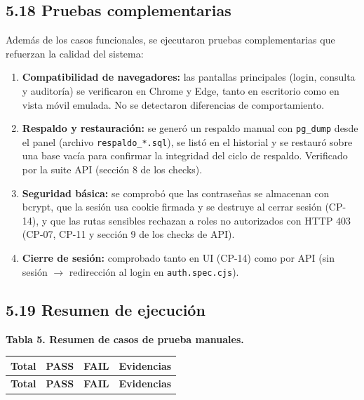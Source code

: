 \documentclass[11pt,a4paper]{article}
\begin{document}
\subsection*{5.18 Pruebas complementarias}


Además de los casos funcionales, se ejecutaron pruebas complementarias que refuerzan la calidad del sistema:


\begin{enumerate}[leftmargin=*]
\item \textbf{Compatibilidad de navegadores:} las pantallas principales (login, consulta y auditoría) se verificaron en Chrome y Edge, tanto en escritorio como en vista móvil emulada. No se detectaron diferencias de comportamiento.
\item \textbf{Respaldo y restauración:} se generó un respaldo manual con \texttt{pg\_dump} desde el panel (archivo \texttt{respaldo\_*.sql}), se listó en el historial y se restauró sobre una base vacía para confirmar la integridad del ciclo de respaldo. Verificado por la suite API (sección 8 de los checks).
\item \textbf{Seguridad básica:} se comprobó que las contraseñas se almacenan con bcrypt, que la sesión usa cookie firmada y se destruye al cerrar sesión (CP-14), y que las rutas sensibles rechazan a roles no autorizados con HTTP 403 (CP-07, CP-11 y sección 9 de los checks de API).
\item \textbf{Cierre de sesión:} comprobado tanto en UI (CP-14) como por API (sin sesión {$\rightarrow$} redirección al login en \texttt{auth.spec.cjs}).
\end{enumerate}


\subsection*{5.19 Resumen de ejecución}


\textbf{Tabla 5. Resumen de casos de prueba manuales.}


{\small
\begin{longtable}{|p{}|p{}|p{}|p{}|}
\rowcolor{UTECblue}\color{white}\bfseries Total & \color{white}\bfseries PASS & \color{white}\bfseries FAIL & \color{white}\bfseries Evidencias \\ \hline
\endfirsthead
\rowcolor{UTECblue}\color{white}\bfseries Total & \color{white}\bfseries PASS & \color{white}\bfseries FAIL & \color{white}\bfseries Evidencias \\ \hline
\endhead
\end{longtable}}
\end{document}
